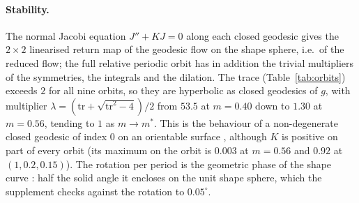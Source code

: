 \documentclass[11pt]{article}
\theoremstyle{definition}
\begin{document}
\paragraph{Stability.} The normal Jacobi equation $J''+KJ=0$ along each closed geodesic gives the $2\times2$
linearised return map of the geodesic flow on the shape sphere, i.e.\ of the reduced flow; the full relative periodic
orbit has in addition the trivial multipliers of the symmetries, the integrals and the dilation. The trace
(Table~\ref{tab:orbits}) exceeds $2$ for all nine orbits, so they are hyperbolic as closed geodesics of $g$, with multiplier
$\lambda=(\mathrm{tr}+\sqrt{\mathrm{tr}^2-4})/2$ from $53.5$ at $m=0.40$ down to $1.30$ at $m=0.56$, tending to $1$ as
$m\to m^*$. This is the behaviour of a non-degenerate closed geodesic of index $0$ on an orientable surface
\cite{Kli78}, although $K$ is positive on part of every orbit (its maximum on the orbit is $0.003$ at $m=0.56$ and
$0.92$ at $(1,0.2,0.15)$). The rotation per period is the geometric phase of the shape curve \cite{Mon96}: half the
solid angle it encloses on the unit shape sphere, which the supplement checks against the rotation to $0.05^\circ$.
\end{document}
